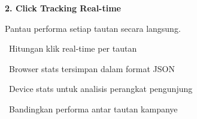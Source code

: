 \documentclass[a4paper]{article}
\begin{document}
\begin{minipage}[t]{0.485\textwidth}
    \colorbox{BluePrimary}{%
        \begin{minipage}{\dimexpr\textwidth-2\fboxsep\relax}
            {\fontsize{10}{13}\selectfont\bfseries\color{White} 2. Click Tracking Real-time}
        \end{minipage}}\par
    \vspace{4pt}
    {\fontsize{9}{12}\selectfont\color{TextDark}%
    Pantau performa setiap tautan secara langsung.\par\vspace{3pt}
    \textbullet\ Hitungan klik real-time per tautan\par\vspace{2pt}%
    \textbullet\ Browser stats tersimpan dalam format JSON\par\vspace{2pt}%
    \textbullet\ Device stats untuk analisis perangkat pengunjung\par\vspace{2pt}%
    \textbullet\ Bandingkan performa antar tautan kampanye}%
\end{minipage}

\vspace{8pt}
\end{document}
